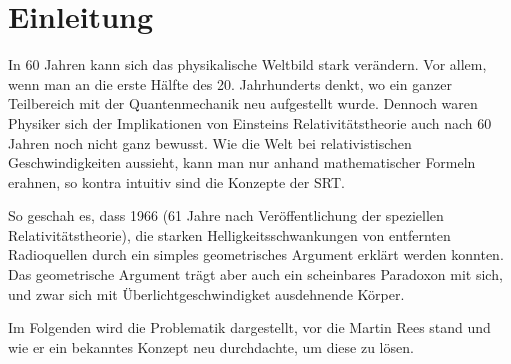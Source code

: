 \section{Einleitung}
\label{sec:einleitung}
In 60 Jahren kann sich das physikalische Weltbild stark verändern. Vor allem, wenn man an die erste Hälfte des 20. Jahrhunderts denkt, wo ein ganzer Teilbereich mit der Quantenmechanik neu aufgestellt wurde. Dennoch waren Physiker sich der Implikationen von Einsteins  Relativitätstheorie auch nach 60 Jahren noch nicht ganz bewusst. Wie die Welt bei relativistischen Geschwindigkeiten aussieht, kann man nur anhand mathematischer Formeln erahnen, so kontra intuitiv sind die Konzepte der SRT.

So geschah es, dass 1966 (61 Jahre nach Veröffentlichung der speziellen Relativitätstheorie), die starken Helligkeitsschwankungen von entfernten Radioquellen durch ein simples geometrisches Argument erklärt werden konnten. 
Das geometrische Argument trägt aber auch ein scheinbares Paradoxon mit sich, und zwar sich mit Überlichtgeschwindigket ausdehnende Körper.

Im Folgenden wird die Problematik dargestellt, vor die Martin Rees stand und wie er ein bekanntes Konzept neu durchdachte, um diese zu lösen.